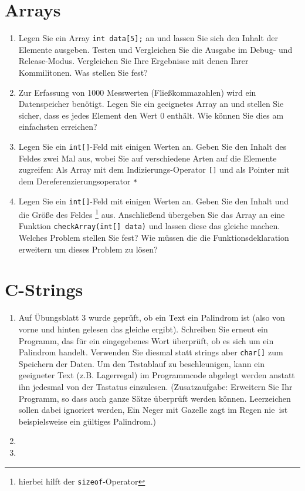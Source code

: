 \documentclass[paper=a4, fontsize=11pt, twoside]{scrartcl}
\begin{document}
\section*{Arrays}
\begin{enumerate}[resume]
  \item Legen Sie ein Array \texttt{int data[5];} an und lassen Sie sich den Inhalt der Elemente ausgeben. Testen und Vergleichen Sie die Ausgabe im Debug- und Release-Modus. Vergleichen Sie Ihre Ergebnisse mit denen Ihrer Kommilitonen. Was stellen Sie fest?
  \item Zur Erfassung von 1000 Messwerten (Fließkommazahlen) wird ein Datenspeicher benötigt. Legen Sie ein geeignetes Array an und stellen Sie sicher, dass es jedes Element den Wert 0 enthält. Wie können Sie dies am einfachsten erreichen?
  \item Legen Sie ein \texttt{int[]}-Feld mit einigen Werten an. Geben Sie den Inhalt des Feldes zwei Mal aus, wobei Sie auf verschiedene Arten auf die Elemente zugreifen: Als Array mit dem Indizierungs-Operator \texttt{[]} und als Pointer mit dem Dereferenzierungsoperator \texttt{*}
  \item Legen Sie ein \texttt{int[]}-Feld mit einigen Werten an. Geben Sie den Inhalt und die Größe des Feldes \footnote{hierbei hilft der \texttt{sizeof}-Operator} aus. Anschließend übergeben Sie das Array an eine Funktion \texttt{checkArray(int[] data)} und lassen diese das gleiche machen. Welches Problem stellen Sie fest? Wie müssen die die Funktionsdeklaration erweitern um dieses Problem zu lösen?
\end{enumerate}


\section*{C-Strings}
\begin{enumerate}
  \item Auf Übungsblatt 3 wurde geprüft, ob ein Text ein Palindrom ist (also von vorne und hinten gelesen das gleiche ergibt). Schreiben Sie erneut ein Programm, das für ein eingegebenes Wort überprüft, ob es sich um ein Palindrom handelt. Verwenden Sie diesmal statt strings aber \texttt{char[]} zum Speichern der Daten. Um den Testablauf zu beschleunigen, kann ein geeigneter Text (z.B. \glqq Lagerregal\grqq) im Programmcode abgelegt werden anstatt ihn jedesmal von der Tastatus einzulesen. (Zusatzaufgabe: Erweitern Sie Ihr Programm, so dass auch ganze Sätze überprüft werden können. Leerzeichen sollen dabei ignoriert werden, \glqq Ein Neger mit Gazelle zagt im Regen nie\grqq\, ist beispielsweise ein gültiges Palindrom.)
  \item 
  \item 
\end{enumerate}
\end{document}

